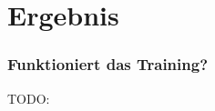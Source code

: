 \section*{Ergebnis}

\begin{frame}
    \frametitle{Funktioniert das Training?}

    TODO:

\end{frame}
